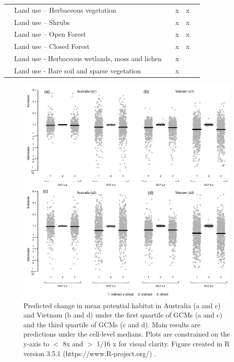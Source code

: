 \documentclass[titlesmallcaps,copyrightpage]{uomthesis}\usepackage[]{graphicx}\usepackage[]{color}
\begin{document}
\begin{table}[htb]
\begin{tabularx}{\textwidth}{lllllY}
 & Land use – Herbaceous vegetation &  & x & x &  \\
 & Land use – Shrubs &  & x & x &  \\
 & Land use – Open Forest &  & x & x &  \\
\textit{} & Land use – Closed Forest &  & x & x &  \\
\textit{} & Land use - Herbaceous wetlands, moss and lichen &  & x &  &  \\
\textit{} & Land use - Bare soil and sparse vegetation &  & x &  &  \\ \bottomrule
\end{tabularx}%
\end{table}

\newpage

\begin{figure}[htb]
  \centering
  \includegraphics[width=\textwidth]{chapters/figures/chapter2/supfig1.pdf}
  \caption{Predicted change in mean potential habitat in Australia (a and c) and Vietnam (b and d) under the first quartile of GCMs (a and c) and the third quartile of GCMs (c and d). Main results are predictions under the cell-level medians. Plots are constrained on the y-axis to  $<$ 8x and $>$ 1/16 x for visual clarity. Figure created in R version 3.5.1 (https://www.R-project.org/) \citep{r_development_core_team_r_2008}.}
  \label{apx:ch2:fig1}
\end{figure}
\end{document}
